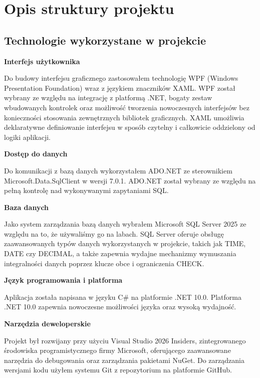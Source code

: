 \chapter{Opis struktury projektu}
\section{Technologie wykorzystane w projekcie}

\textbf{Interfejs użytkownika}

Do budowy interfejsu graficznego zastosowałem technologię WPF (Windows Presentation Foundation) wraz z językiem 
znaczników XAML. WPF został wybrany ze względu na integrację z platformą .NET, bogaty zestaw wbudowanych 
kontrolek oraz możliwość tworzenia nowoczesnych interfejsów bez konieczności stosowania zewnętrznych bibliotek 
graficznych. XAML umożliwia deklaratywne definiowanie interfejsu w sposób czytelny i całkowicie oddzielony od 
logiki aplikacji.

\vspace{10pt}

\textbf{Dostęp do danych}

Do komunikacji z bazą danych wykorzystałem ADO.NET ze sterownikiem Microsoft.Data.SqlClient w wersji 7.0.1. ADO.NET 
został wybrany ze względu na pełną kontrolę nad wykonywanymi zapytaniami SQL. 

\vspace{10pt}

\textbf{Baza danych}

Jako system zarządzania bazą danych wybrałem Microsoft SQL Server 2025 ze względu na to, że używaliśmy go na labach. 
SQL Server oferuje obsługę zaawansowanych typów danych wykorzystanych w projekcie, 
takich jak TIME, DATE czy DECIMAL, a także zapewnia wydajne mechanizmy wymuszania integralności danych poprzez 
klucze obce i ograniczenia CHECK.

\vspace{10pt}

\textbf{Język programowania i platforma}

Aplikacja została napisana w języku C\# na platformie .NET 10.0. Platforma .NET 10.0 zapewnia 
nowoczesne możliwości języka oraz wysoką wydajność.

\vspace{10pt}

\textbf{Narzędzia deweloperskie}

Projekt był rozwijany przy użyciu Visual Studio 2026 Insiders, zintegrowanego środowiska programistycznego 
firmy Microsoft, oferującego zaawansowane narzędzia do debugowania
oraz zarządzania pakietami NuGet. Do zarządzania wersjami kodu użyłem systemu Git z repozytorium na 
platformie GitHub.

